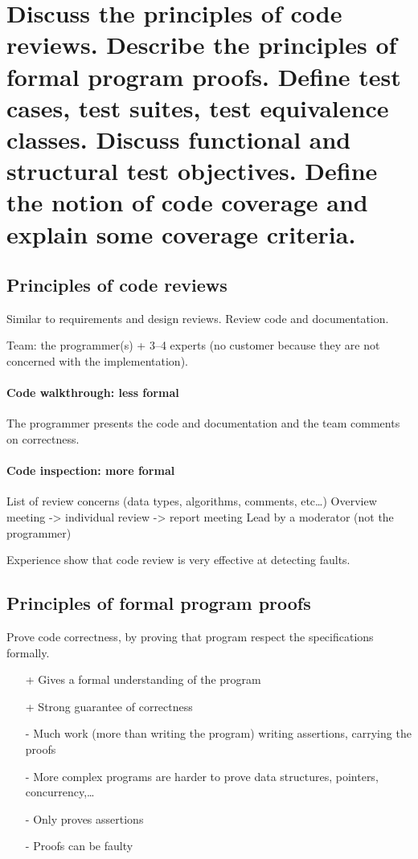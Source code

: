 \clearpage{}
\section{Discuss the principles of code reviews. Describe the principles of
formal program proofs. Define test cases, test suites, test equivalence
classes. Discuss functional and structural test objectives. Define the
notion of code coverage and explain some coverage criteria.}


\subsection{Principles of code reviews}

Similar to requirements and design reviews. \newline
Review code and documentation. \newline

Team: the programmer(s) + 3--4 experts (no customer because they are not concerned with the implementation).

\paragraph{Code walkthrough: less formal}
The programmer presents the code and documentation and the team comments on
correctness.

\paragraph{Code inspection: more formal}

List of review concerns (data types, algorithms, comments, etc\ldots)
Overview meeting -> individual review -> report meeting
Lead by a moderator (not the programmer) \newline

Experience show that code review is very effective at detecting faults.

\subsection{Principles of formal program proofs}

Prove code correctness, by proving that program respect the specifications formally. \newline

\begin{itemize}
    \item[+] Gives a formal understanding of the program
    \item[+] Strong guarantee of correctness
    \item[-] Much work (more than writing the program) writing assertions, carrying the proofs
    \item[-] More complex programs are harder to prove data structures, pointers, concurrency,\ldots
    \item[-] Only proves assertions
    \item[-] Proofs can be faulty
\end{itemize}

